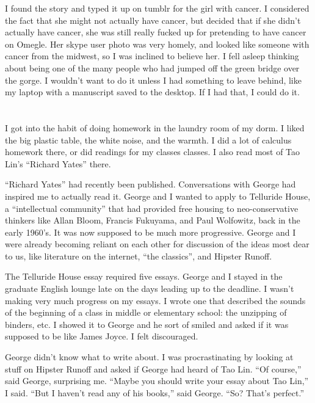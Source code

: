 I found the story and typed it up on tumblr for the girl with cancer.  I
considered the fact that she might not actually have cancer, but decided that if
she didn't actually have cancer, she was still really fucked up for pretending
to have cancer on Omegle.  Her skype user photo was very homely, and looked like
someone with cancer from the midwest, so I was inclined to believe her.  I fell
asleep thinking about being one of the many people who had jumped off the green
bridge over the gorge.  I wouldn't want to do it unless I had something to leave
behind, like my laptop with a manuscript saved to the desktop.  If I had that, I
could do it.

\section{}

I got into the habit of doing homework in the laundry room of my dorm.  I liked
the big plastic table, the white noise, and the warmth.  I did a lot of calculus
homework there, or did readings for my classes classes.  I also read most of Tao
Lin's ``Richard Yates'' there.  

``Richard Yates'' had recently been published.  Conversations with George had
inspired me to actually read it.  George and I wanted to apply to Telluride
House, a ``intellectual community'' that had provided free housing to
neo-conservative thinkers like Allan Bloom, Francis Fukuyama, and Paul
Wolfowitz, back in the early 1960's.  It was now supposed to be much more
progressive.  George and I were already becoming reliant on each other for
discussion of the ideas most dear to us, like literature on the internet, ``the
classics'', and Hipster Runoff. 

The Telluride House essay required five essays.  George and I stayed in the
graduate English lounge late on the days leading up to the deadline.  I wasn't
making very much progress on my essays.  I wrote one that described the sounds
of the beginning of a class in middle or elementary school: the unzipping of
binders, etc.  I showed it to George and he sort of smiled and asked if it was
supposed to be like James Joyce.  I felt discouraged. 

George didn't know what to write about.  I was procrastinating by looking at
stuff on Hipster Runoff and asked if George had heard of Tao Lin.  ``Of
course,'' said George, surprising me.  ``Maybe you should write your essay about
Tao Lin,'' I said.  ``But I haven't read any of his books,'' said George.  ``So?
That's perfect.''

